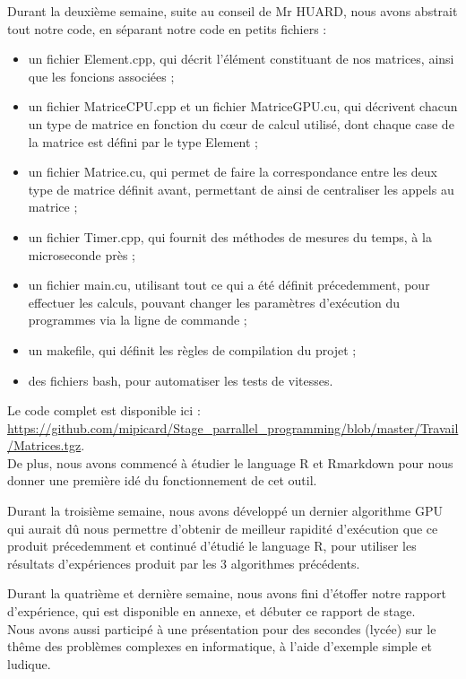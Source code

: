 \documentclass[a4paper,12pt]{article}
\begin{document}
{	\vspace{10pt}
	\indent Durant la deuxi\`eme semaine, suite au conseil de Mr HUARD, nous avons abstrait tout notre code, en s\'e{}parant notre code en petits fichiers :
	\begin{itemize}
	    \item un fichier Element.cpp, qui d\'e{}crit l'\'e{}l\'e{}ment constituant de nos matrices, ainsi que les foncions associ\'e{}es ;
	    \item un fichier MatriceCPU.cpp et un fichier MatriceGPU.cu, qui d\'e{}crivent chacun un type de matrice en fonction du c\oe{}ur de calcul utilis\'e{}, dont chaque case de la matrice est d\'e{}fini par le type Element ;
	    \item un fichier Matrice.cu, qui permet de faire la correspondance entre les deux type de matrice d\'e{}finit avant, permettant de ainsi de centraliser les appels au matrice ;
	    \item un fichier Timer.cpp, qui fournit des m\'e{}thodes de mesures du temps, \`a la microseconde pr\`es ;
	    \item un fichier main.cu, utilisant tout ce qui a \'e{}t\'e d\'e{}finit pr\'e{}cedemment, pour effectuer les calculs, pouvant changer les param\`etres d'ex\'e{}cution du programmes via la ligne de commande ;
	    \item un makefile, qui d\'e{}finit les r\`egles de compilation du projet ;
	    \item des fichiers bash, pour automatiser les tests de vitesses.
	\end{itemize}
	Le code complet est disponible ici :  \url{https://github.com/mipicard/Stage_parrallel_programming/blob/master/Travail/Matrices.tgz}.\\
	\indent De plus, nous avons commenc\'e \`a \'e{}tudier le language R et Rmarkdown pour nous donner une première id\'e{} du fonctionnement de cet outil.
	
	\vspace{10pt}
	\indent Durant la troisi\`eme semaine, nous avons d\'e{}velopp\'e un dernier algorithme GPU qui aurait d\^u nous permettre d'obtenir de meilleur rapidit\'e{} d'ex\'e{}cution que ce produit pr\'e{}cedemment et continu\'e{} d'\'e{}tudi\'e{} le language R, pour utiliser les r\'e{}sultats d'exp\'e{}riences produit par les 3 algorithmes pr\'e{}c\'e{}dents.
	
	\vspace{10pt}
	\indent Durant la quatri\`eme et derni\`ere semaine, nous avons fini d'\'e{}toffer notre rapport d'exp\'e{}rience, qui est disponible en annexe, et d\'e{}buter ce rapport de stage.\\
	\indent Nous avons aussi particip\'e \`a une pr\'e{}sentation pour des secondes (lyc\'e{}e) sur le th\^eme des probl\`emes complexes en informatique, \`a l'aide d'exemple simple et ludique.
}
\end{document}
